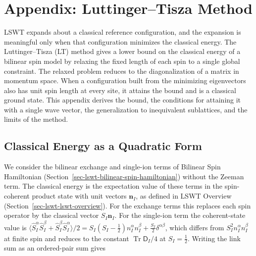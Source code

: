 
\hypertarget{sec-lswt-luttinger-tisza-method}{%
\section{Appendix: Luttinger--Tisza Method}\label{sec-lswt-luttinger-tisza-method}}

LSWT expands about a classical reference configuration, and the expansion is meaningful only when that configuration minimizes the classical energy. The Luttinger--Tisza (LT) method gives a lower bound on the classical energy of a bilinear spin model by relaxing the fixed length of each spin to a single global constraint. The relaxed problem reduces to the diagonalization of a matrix in momentum space. When a configuration built from the minimizing eigenvectors also has unit spin length at every site, it attains the bound and is a classical ground state. This appendix derives the bound, the conditions for attaining it with a single wave vector, the generalization to inequivalent sublattices, and the limits of the method.

\subsection{Classical Energy as a Quadratic Form}

We consider the bilinear exchange and single-ion terms of Bilinear Spin Hamiltonian (Section~\ref{sec-lswt-bilinear-spin-hamiltonian}) without the Zeeman term. The classical energy is the expectation value of these terms in the spin-coherent product state with unit vectors \(\mathbf n_I\), as defined in LSWT Overview (Section~\ref{sec-lswt-lswt-overview}). For the exchange terms this replaces each spin operator by the classical vector \(S_I\mathbf n_I\). For the single-ion term the coherent-state value is \(\langle\hat S_I^\alpha\hat S_I^\beta+\hat S_I^\beta\hat S_I^\alpha\rangle/2=S_I(S_I-\tfrac12)n_I^\alpha n_I^\beta+\tfrac{S_I}2\delta^{\alpha\beta}\), which differs from \(S_I^2n_I^\alpha n_I^\beta\) at finite spin and reduces to the constant \(\operatorname{Tr}\mathsf D_I/4\) at \(S_I=\tfrac12\). Writing the link sum as an ordered-pair sum gives

